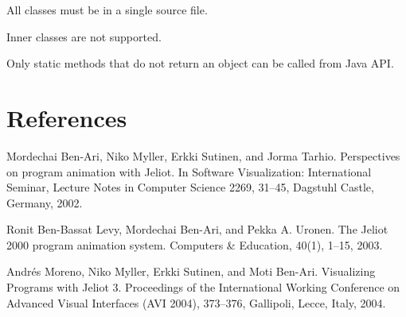 \documentclass{article}
\begin{document}
All classes must be in a single source file. 


Inner classes are not supported.

Only static methods that do not return an object can be called from Java API.

\section{References}

Mordechai Ben-Ari, Niko Myller, Erkki Sutinen, and Jorma Tarhio. Perspectives 
on program animation with Jeliot. In Software Visualization: International 
Seminar, Lecture Notes in Computer Science 2269, 31--45, Dagstuhl Castle, 
Germany, 2002.

Ronit Ben-Bassat Levy, Mordechai Ben-Ari, and Pekka A. Uronen. The Jeliot 2000 
program animation system. Computers \& Education, 40(1), 1--15, 2003.

Andr\'{e}s Moreno, Niko Myller, Erkki Sutinen, and Moti Ben-Ari. Visualizing Programs with Jeliot 3. Proceedings of the International Working Conference on Advanced Visual Interfaces (AVI 2004), 373--376, Gallipoli, Lecce, Italy, 2004.
\end{document}
